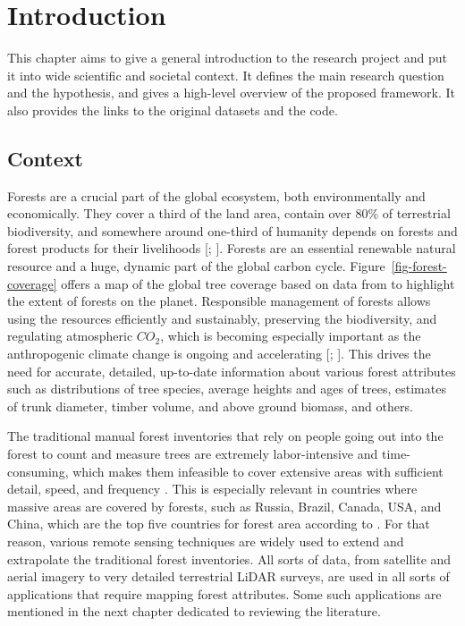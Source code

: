 \chapter{Introduction}\label{cap:introduction}

This chapter aims to give a general introduction to the research project and put it into wide scientific and societal context.
It defines the main research question and the hypothesis, and gives a high-level overview of the proposed framework.
It also provides the links to the original datasets and the code.

\section{Context}
Forests are a crucial part of the global ecosystem, both environmentally and economically.
They cover a third of the land area, contain over 80\% of terrestrial biodiversity, and somewhere around one-third of humanity depends on forests and forest products for their livelihoods [\citet{aertsForestRestorationBiodiversity2011}; \citet{StateWorldsForests2020}].
Forests are an essential renewable natural resource and a huge, dynamic part of the global carbon cycle.
Figure~\ref{fig-forest-coverage} offers a map of the global tree coverage based on data from \citet{hansenHighResolutionGlobalMaps2013} to highlight the extent of forests on the planet.
Responsible management of forests allows using the resources efficiently and sustainably, preserving the biodiversity, and regulating atmospheric $CO_2$, which is becoming especially important as the anthropogenic climate change is ongoing and accelerating [\citet{faheyForestCarbonStorage2010}; \citet{forsterIndicatorsGlobalClimate2024}].
This drives the need for accurate, detailed, up-to-date information about various forest attributes such as distributions of tree species, average heights and ages of trees, estimates of trunk diameter, timber volume, and above ground biomass, and others.

The traditional manual forest inventories that rely on people going out into the forest to count and measure trees are extremely labor-intensive and time-consuming, which makes them infeasible to cover extensive areas with sufficient detail, speed, and frequency \citep{burleyEncyclopediaForestSciences2004}.
This is especially relevant in countries where massive areas are covered by forests, such as Russia, Brazil, Canada, USA, and China, which are the top five countries for forest area according to \citet{GlobalForestResources2020}.
For that reason, various remote sensing techniques are widely used to extend and extrapolate the traditional forest inventories.
All sorts of data, from satellite and aerial imagery to very detailed terrestrial LiDAR surveys, are used in all sorts of applications that require mapping forest attributes.
Some such applications are mentioned in the next chapter dedicated to reviewing the literature.

